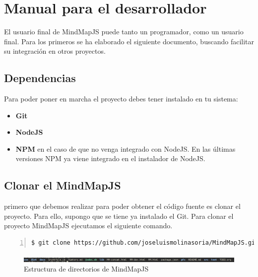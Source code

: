 \section{Manual para el desarrollador}

El usuario final de MindMapJS puede tanto un programador, como un usuario final. Para los primeros se ha elaborado el siguiente documento, buscando facilitar su integración en otros proyectos. 

\subsection{Dependencias}
Para poder poner en marcha el proyecto debes tener instalado en tu sistema:
\begin{itemize}
\item \textbf{Git}
\item \textbf{NodeJS}
\item \textbf{NPM} en el caso de que no venga integrado con NodeJS. En las últimas versiones NPM ya viene integrado en el instalador de NodeJS. 
\end{itemize}

\subsection{Clonar el MindMapJS}
primero que debemos realizar para poder obtener el código fuente es clonar el proyecto. Para ello, supongo que se tiene ya instalado el Git. Para clonar el proyecto MindMapJS ejecutamos el siguiente comando.

\begin{lstlisting}[language=bash, numbers=left]
$ git clone https://github.com/joseluismolinasoria/MindMapJS.git
\end{lstlisting}

\begin{figure}[tbph]
\centering
\includegraphics[width=\linewidth]{imagenes/directorioProyecto}
\caption{Estructura de directorios de MindMapJS}
\label{fig:directorio-proyecto}
\end{figure}

